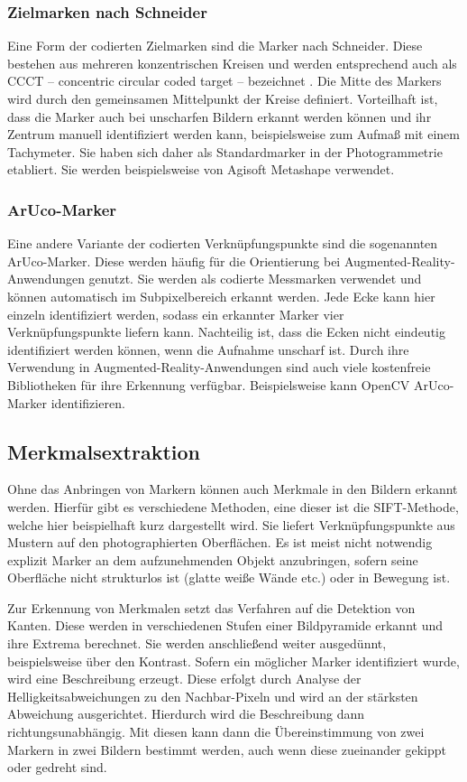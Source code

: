 \documentclass[./00PhotoBox.tex]{subfiles}
\begin{document}
\subsubsection{Zielmarken nach Schneider}
Eine Form der codierten Zielmarken sind die Marker nach Schneider. Diese bestehen aus mehreren konzentrischen Kreisen und werden entsprechend auch als CCCT -- concentric circular coded target -- bezeichnet \citep{ccct}. Die Mitte des Markers wird durch den gemeinsamen Mittelpunkt der Kreise definiert.  Vorteilhaft ist, dass die Marker auch bei unscharfen Bildern erkannt werden können und ihr Zentrum manuell identifiziert werden kann, beispielsweise zum Aufmaß mit einem Tachymeter. Sie haben sich daher als Standardmarker in der Photogrammetrie etabliert. Sie werden beispielsweise von Agisoft Metashape verwendet.


\subsubsection{ArUco-Marker}
Eine andere Variante der codierten Verknüpfungspunkte sind die sogenannten ArUco-Marker. Diese werden häufig für die Orientierung bei Augmented-Reality-An\-wend\-ungen genutzt. Sie werden als codierte Messmarken verwendet und können automatisch im Subpixelbereich erkannt werden. Jede Ecke kann hier einzeln identifiziert werden, sodass ein erkannter Marker vier Verknüpfungspunkte liefern kann. Nachteilig ist, dass die Ecken nicht eindeutig identifiziert werden können, wenn die Aufnahme unscharf ist. Durch ihre Verwendung in Augmented-Reality-Anwendungen sind auch viele kostenfreie Bibliotheken für ihre Erkennung verfügbar. Beispielsweise kann OpenCV ArUco-Marker identifizieren. %

\subsection{Merkmalsextraktion}
Ohne das Anbringen von Markern können auch Merkmale in den Bildern erkannt werden. Hierfür gibt es verschiedene Methoden, eine dieser ist die SIFT-Methode, welche hier beispielhaft kurz dargestellt wird. Sie liefert Verknüpfungspunkte aus Mustern auf den photographierten Oberflächen. Es ist meist nicht notwendig explizit Marker an dem aufzunehmenden Objekt anzubringen, sofern seine Oberfläche nicht strukturlos ist (glatte weiße Wände etc.) oder in Bewegung ist.

Zur Erkennung von Merkmalen setzt das Verfahren auf die Detektion von Kanten. Diese werden in verschiedenen Stufen einer Bildpyramide erkannt und ihre Extrema berechnet. Sie werden anschließend weiter ausgedünnt, beispielsweise über den Kontrast. Sofern ein möglicher Marker identifiziert wurde, wird eine Beschreibung erzeugt. Diese erfolgt  durch Analyse der Helligkeitsabweichungen zu den Nachbar-Pixeln und wird an der stärksten Abweichung ausgerichtet. Hierdurch wird die Beschreibung dann richtungsunabhängig. Mit diesen kann dann die Übereinstimmung von zwei Markern in zwei Bildern bestimmt werden, auch wenn diese zueinander gekippt oder gedreht sind.
\citep[S. 484f]{luhmann}
\end{document}
